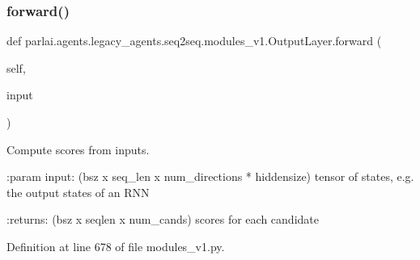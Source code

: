 \subsubsection{\texorpdfstring{forward()}{forward()}}
{\footnotesize\ttfamily def parlai.\+agents.\+legacy\+\_\+agents.\+seq2seq.\+modules\+\_\+v1.\+Output\+Layer.\+forward (\begin{DoxyParamCaption}\item[{}]{self,  }\item[{}]{input }\end{DoxyParamCaption})}

\begin{DoxyVerb}Compute scores from inputs.

:param input: (bsz x seq_len x num_directions * hiddensize) tensor of
       states, e.g. the output states of an RNN

:returns: (bsz x seqlen x num_cands) scores for each candidate
\end{DoxyVerb}
 

Definition at line 678 of file modules\+\_\+v1.\+py.


